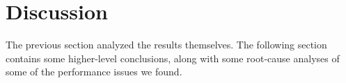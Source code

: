 \documentclass[a4paper,UKenglish,cleveref, autoref, thm-restate,anonymous]{lipics-v2021}
\begin{document}
% 
% 
%
% 
% 
% 
%
%
%
% 
% 
%
% 
% 
%
% 
%
%
%
% 
%
% 
% 
% 
%
%
% 
%
% 
%
%
% 

\section{Discussion}
\label{sec:discuss}

The previous section analyzed the results themselves. The following section
contains some higher-level conclusions, along with some root-cause analyses
of some of the performance issues we found.
\end{document}
